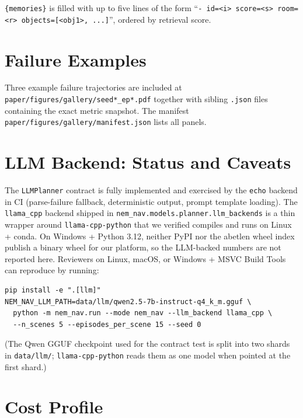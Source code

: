 \documentclass[conference,a4paper,10pt]{IEEEtran}
\begin{document}
\noindent
\texttt{\{memories\}} is filled with up to five lines of the form
``\texttt{- id=<i> score=<s> room=<r> objects=[<obj1>, ...]}'',
ordered by retrieval score.

\section{Failure Examples}
\label{app:failures}

Three example failure trajectories are included at
\texttt{paper/figures/gallery/seed*\_ep*.pdf} together with sibling
\texttt{.json} files containing the exact metric snapshot. The
manifest \texttt{paper/figures/gallery/manifest.json} lists all
panels.

\section{LLM Backend: Status and Caveats}
\label{app:llm}

The \texttt{LLMPlanner} contract is fully implemented and exercised by
the \texttt{echo} backend in CI (parse-failure fallback, deterministic
output, prompt template loading). The \texttt{llama\_cpp} backend
shipped in \texttt{nem\_nav.models.planner.llm\_backends} is a thin
wrapper around \texttt{llama-cpp-python} that we verified compiles
and runs on Linux + conda. On Windows + Python 3.12, neither PyPI nor
the abetlen wheel index publish a binary wheel for our platform, so
the LLM-backed numbers are not reported here. Reviewers on Linux,
macOS, or Windows + MSVC Build Tools can reproduce by running:

\begin{verbatim}
pip install -e ".[llm]"
NEM_NAV_LLM_PATH=data/llm/qwen2.5-7b-instruct-q4_k_m.gguf \
  python -m nem_nav.run --mode nem_nav --llm_backend llama_cpp \
  --n_scenes 5 --episodes_per_scene 15 --seed 0
\end{verbatim}

(The Qwen GGUF checkpoint used for the contract test is split into two
shards in \texttt{data/llm/}; \texttt{llama-cpp-python} reads them as
one model when pointed at the first shard.)

\section{Cost Profile}
\label{app:cost}
\end{document}
